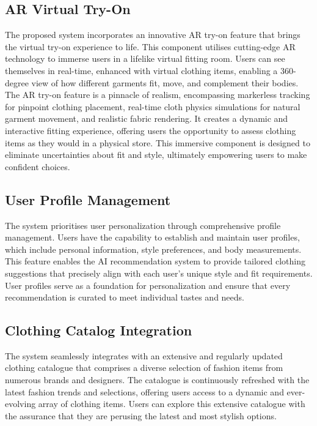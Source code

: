 	\subsection{AR Virtual Try-On}
		The proposed system incorporates an innovative AR try-on feature that brings the virtual try-on experience to life. This component utilises cutting-edge AR technology to immerse users in a lifelike virtual fitting room. Users can see themselves in real-time, enhanced with virtual clothing items, enabling a 360-degree view of how different garments fit, move, and complement their bodies. The AR try-on feature is a pinnacle of realism, encompassing markerless tracking for pinpoint clothing placement, real-time cloth physics simulations for natural garment movement, and realistic fabric rendering. It creates a dynamic and interactive fitting experience, offering users the opportunity to assess clothing items as they would in a physical store. This immersive component is designed to eliminate uncertainties about fit and style, ultimately empowering users to make confident choices.

	\subsection{User Profile Management}
		The system prioritises user personalization through comprehensive profile management. Users have the capability to establish and maintain user profiles, which include personal information, style preferences, and body measurements. This feature enables the AI recommendation system to provide tailored clothing suggestions that precisely align with each user's unique style and fit requirements. User profiles serve as a foundation for personalization and ensure that every recommendation is curated to meet individual tastes and needs.

	\subsection{Clothing Catalog Integration}
		The system seamlessly integrates with an extensive and regularly updated clothing catalogue that comprises a diverse selection of fashion items from numerous brands and designers. The catalogue is continuously refreshed with the latest fashion trends and selections, offering users access to a dynamic and ever-evolving array of clothing items. Users can explore this extensive catalogue with the assurance that they are perusing the latest and most stylish options.

